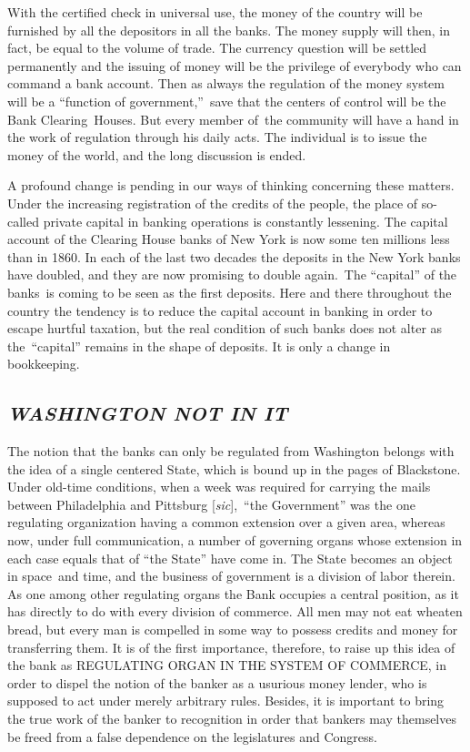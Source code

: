 \documentclass[openany,nobib]{tufte-book}
\begin{document}
With the certified check in universal use, the money of the country will
be furnished by all the depositors in all the banks. The money supply
will then, in fact, be equal to the volume of trade. The currency
question will be settled permanently and the issuing of money will be
the privilege of everybody who can command a bank account. Then as
always the regulation of the money system will be a ``function of
government,''~save that the centers of control will be the Bank
Clearing~Houses. But every member of~the community will have a hand in
the work of regulation through his daily acts. The individual is to
issue the money of the world, and the long discussion is ended.~

A profound change is pending in our ways of thinking concerning these
matters. Under the increasing registration of the credits of the people,
the place of so-called private capital in banking operations is
constantly lessening. The capital account of the Clearing House banks of
New York is now some ten millions less than in 1860. In each of the last
two decades the deposits in the New York banks have doubled, and they
are now promising to double again.~The ``capital'' of the banks~is
coming to be seen as the first deposits. Here and there throughout the
country the tendency is to reduce the capital account in banking in
order to escape hurtful taxation, but the real condition of such banks
does not alter as the~``capital'' remains in the shape of deposits. It
is only a change in bookkeeping.~

\hypertarget{washington-not-in-it}{%
\subsection{\texorpdfstring{\emph{WASHINGTON NOT IN
IT}}{WASHINGTON NOT IN IT}}\label{washington-not-in-it}}

The notion that the banks can only be regulated from Washington belongs
with the idea of a single centered State, which is bound up in the pages
of Blackstone. Under old-time conditions, when a week was required for
carrying the mails between Philadelphia and Pittsburg
{[}\emph{sic}{]},~``the Government'' was the one regulating organization
having a common extension over a given area, whereas now, under full
communication, a number of governing organs whose extension in each case
equals that of ``the State'' have come in. The State becomes an object
in space~and time, and the business of government is a division of labor
therein. As one among other regulating organs the Bank occupies a
central position, as it has directly to do with every division of
commerce. All men may not eat wheaten bread, but every man is compelled
in some way to possess credits and money for transferring them. It is of
the first importance, therefore, to raise up this idea of the bank as
REGULATING ORGAN IN THE SYSTEM OF COMMERCE, in order to dispel the
notion of the banker as a usurious money lender, who is supposed to act
under merely arbitrary rules. Besides, it is important to bring the true
work of the banker to recognition in order that bankers may themselves
be freed from a false dependence on the legislatures and Congress. ~
\end{document}
